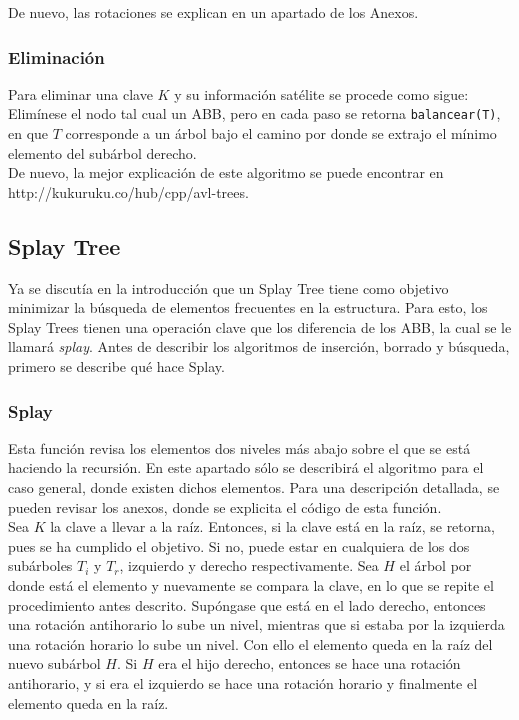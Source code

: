 \documentclass[12pt,letterpaper]{report}
\begin{document}
De nuevo, las rotaciones se explican en un apartado de los Anexos.

\subsubsection{Eliminación}
Para eliminar una clave $K$ y su información satélite se procede como sigue: Elimínese el nodo tal cual un ABB, pero en cada paso se retorna \texttt{balancear(T)}, en que $T$ corresponde a un árbol bajo el camino por donde se extrajo el mínimo elemento del subárbol derecho.\\

De nuevo, la mejor explicación de este algoritmo se puede encontrar en http://kukuruku.co/hub/cpp/avl-trees.

\subsection{Splay Tree}
Ya se discutía en la introducción que un Splay Tree tiene como objetivo minimizar la búsqueda de elementos frecuentes en la estructura. Para esto, los Splay Trees tienen una operación clave que los diferencia de los ABB, la cual se le llamará \emph{splay}. Antes de describir los algoritmos de inserción, borrado y búsqueda, primero se describe qué hace Splay.

\subsubsection{Splay}
Esta función revisa los elementos dos niveles más abajo sobre el que se está haciendo la recursión. En este apartado sólo se describirá el algoritmo para el caso general, donde existen dichos elementos. Para una descripción detallada, se pueden revisar los anexos, donde se explicita el código de esta función.\\

Sea $K$ la clave a llevar a la raíz. Entonces, si la clave está en la raíz, se retorna, pues se ha cumplido el objetivo. Si no, puede estar en cualquiera de los dos subárboles $T_i$ y $T_r$, izquierdo y derecho respectivamente. Sea $H$ el árbol por donde está el elemento y nuevamente se compara la clave, en lo que se repite el procedimiento antes descrito. Supóngase que está en el lado derecho, entonces una rotación antihorario lo sube un nivel, mientras que si estaba por la izquierda una rotación horario lo sube un nivel. Con ello el elemento queda en la raíz del nuevo subárbol $H$. Si $H$ era el hijo derecho, entonces se hace una rotación antihorario, y si era el izquierdo se hace una rotación horario y finalmente el elemento queda en la raíz.\\
\end{document}
